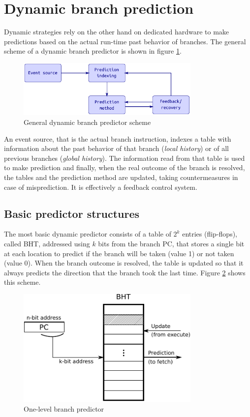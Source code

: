 \section{Dynamic branch prediction}\label{sec:dynbp}
Dynamic strategies rely on the other hand on dedicated hardware to make predictions based on the actual run-time past behavior of branches. The general scheme of a dynamic branch predictor is shown in figure \ref{fig:bpfeedback}.
\begin{figure}[hbtp]
  \centering
  \includegraphics[width=0.8\textwidth]{img/bpfeedback.pdf}
  \caption{General dynamic branch predictor scheme}
  \label{fig:bpfeedback}
\end{figure}
An event source, that is the actual branch instruction, indexes a table with information about the past behavior of that branch (\emph{local history}) or of all previous branches (\emph{global history}). The information read from that table is used to make prediction and finally, when the real outcome of the branch is resolved, the tables and the prediction method are updated, taking countermeasures in case of misprediction. It is effectively a feedback control system.

\subsection{Basic predictor structures}
The most basic dynamic predictor consists of a table of $2^k$ entries (flip-flops), called \ac{BHT}, addressed using $k$ bits from the branch \ac{PC}, that stores a single bit at each location to predict if the branch will be taken (value 1) or not taken (value 0). When the branch outcome is resolved, the table is updated so that it always predicts the direction that the branch took the last time. Figure \ref{fig:one-level-bp} shows this scheme.
\begin{figure}[hbtp]
  \centering
  \includegraphics[width=0.8\textwidth]{img/one-level-bp.pdf}
  \caption{One-level branch predictor}
  \label{fig:one-level-bp}
\end{figure}

